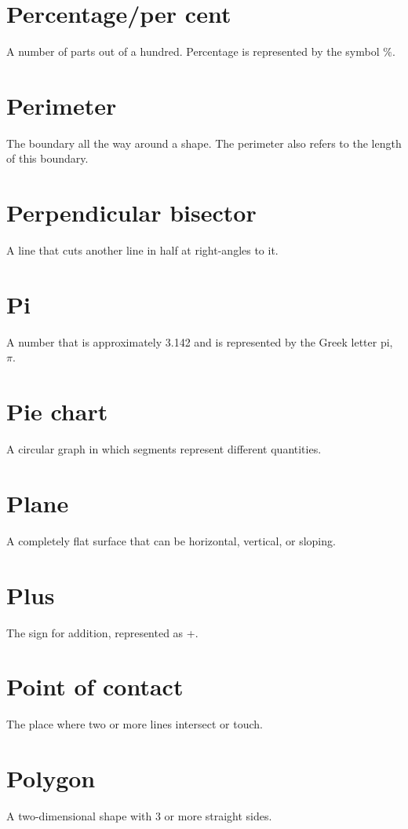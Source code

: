 \documentclass[10pt]{article}
\begin{document}
\section*{Percentage/per cent}
A number of parts out of a hundred. Percentage is represented by the symbol $\%$.

\section*{Perimeter}
The boundary all the way around a shape. The perimeter also refers to the length of this boundary.

\section*{Perpendicular bisector}
A line that cuts another line in half at right-angles to it.

\section*{Pi}
A number that is approximately 3.142 and is represented by the Greek letter pi, $\pi$.

\section*{Pie chart}
A circular graph in which segments represent different quantities.

\section*{Plane}
A completely flat surface that can be horizontal, vertical, or sloping.

\section*{Plus}
The sign for addition, represented as +.

\section*{Point of contact}
The place where two or more lines intersect or touch.

\section*{Polygon}
A two-dimensional shape with 3 or more straight sides.
\end{document}
